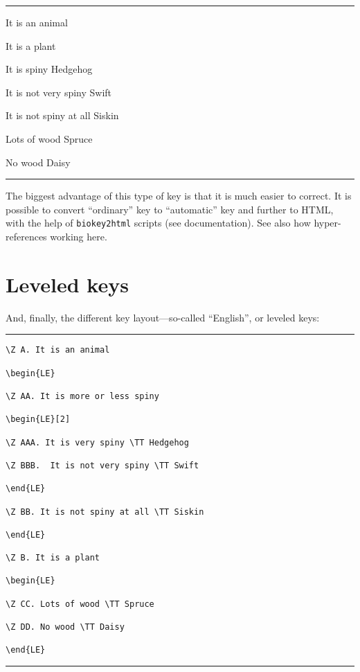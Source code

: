 \documentclass{article}
\begin{document}
\hrule\bigskip

 It is an animal 

\AN  It is a plant 

 It is spiny \TT Hedgehog

\AN  It is not very spiny \TT Swift

\AAN  It is not spiny at all \TT Siskin

 Lots of wood \TT Spruce

\AN No wood \TT Daisy

\bigskip\hrule\bigskip

The biggest advantage of this type of key is that it is much easier to correct. It is possible to convert ``ordinary'' key to ``automatic'' key and further to HTML, with the help of \texttt{biokey2html} scripts (see documentation). See also how hyper-references working here.

\section{Leveled keys}

And, finally, the different key layout---so-called ``English'', or leveled keys:

\bigskip\hrule

\begin{verbatim}
\Z A. It is an animal

\begin{LE}

\Z AA. It is more or less spiny

\begin{LE}[2]

\Z AAA. It is very spiny \TT Hedgehog

\Z BBB.  It is not very spiny \TT Swift

\end{LE}

\Z BB. It is not spiny at all \TT Siskin

\end{LE}

\Z B. It is a plant

\begin{LE}

\Z CC. Lots of wood \TT Spruce

\Z DD. No wood \TT Daisy

\end{LE}
\end{verbatim}

\hrule\bigskip
\end{document}
